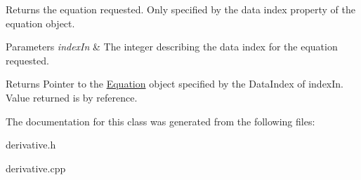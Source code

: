 Returns the equation requested. Only specified by the data index property of the equation object. 
\begin{DoxyParams}{Parameters}
{\em index\-In} & The integer describing the data index for the equation requested. \\
\hline
\end{DoxyParams}
\begin{DoxyReturn}{Returns}
Pointer to the \hyperlink{class_equation}{Equation} object specified by the Data\-Index of index\-In. Value returned is by reference. 
\end{DoxyReturn}


The documentation for this class was generated from the following files\-:\begin{DoxyCompactItemize}
\item 
derivative.\-h\item 
derivative.\-cpp\end{DoxyCompactItemize}
